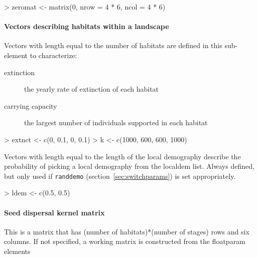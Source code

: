 \documentclass[10pt]{article}
\newcommand{\code}[1]{\texttt{#1}}
\begin{document}
\begin{Schunk}
\begin{Sinput}
> zeromat <- matrix(0, nrow = 4 * 6, ncol = 4 * 6)
\end{Sinput}
\end{Schunk}

\paragraph{Vectors describing habitats within a landscape}
\label{Probabilities}
Vectors with length equal to the number of habitats are defined in this sub-element to characterize:
\begin{description}
\item[extinction] the yearly rate of extinction of each habitat
\item[carrying capacity] the largest number of individuals supported in each habitat 
\end{description}
\begin{Schunk}
\begin{Sinput}
> extnct <- c(0, 0.1, 0, 0.1)
> k <- c(1000, 600, 600, 1000)
\end{Sinput}
\end{Schunk}

Vectors with length equal to the length of the local demography
describe the probability of picking a local demography from the
localdem list.  Always defined, but only used if \code{randdemo}
(section~\ref{sec:switchparams}) is set appropriately.
\begin{Schunk}
\begin{Sinput}
> ldem <- c(0.5, 0.5)
\end{Sinput}
\end{Schunk}

\paragraph{Seed dispersal kernel matrix}
This is a matrix that has (number of habitats)*(number of stages) rows
and six columns.  If not specified, a working matrix is constructed
from the floatparam elements
\end{document}
